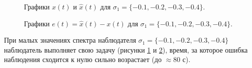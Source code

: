 \begin{figure}[!h]
\caption{Графики $x(t)$ и $\hat{x}(t)$ для $ \sigma_1 = \{ -0.1, -0.2, -0.3, -0.4 \}$.}
\label{3_xx_nlin_02_L2}
\end{figure}


\begin{figure}[!h]
\caption{Графики $e (t) =\hat{x}(t) - x(t)$ для $ \sigma_1 = \{ -0.1, -0.2, -0.3, -0.4 \}$.}
\label{3_e_nlin_02_L2}
\end{figure}

При малых значениях спектра наблюдателя  $ \sigma_1 = \{ -0.1, -0.2, -0.3, -0.4 \}$ наблюдатель выполняет свою задачу (рисунки \ref{3_xx_nlin_02_L2} и \ref{3_e_nlin_02_L2}), время, за которое ошибка наблюдения сходится к нулю сильно возрастает (до $\approx 80$ с).



